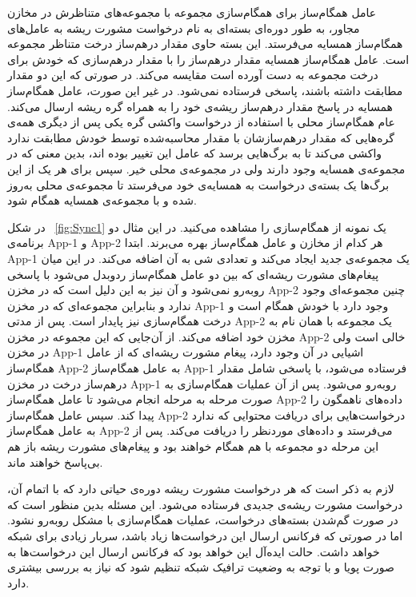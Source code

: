 عامل همگام‌ساز برای همگام‌سازی مجموعه با مجموعه‌های متناظرش در مخازن مجاور، به طور دوره‌ای بسته‌ای به نام درخواست مشورت ریشه به عامل‌های همگام‌ساز همسایه می‌فرستد. این بسته حاوی مقدار درهم‌ساز درخت متناظر مجموعه است. عامل همگام‌ساز همسایه مقدار در‌هم‌ساز را با مقدار در‌هم‌سازی که خودش برای درخت مجموعه به دست آورده است مقایسه می‌کند. در صورتی که این دو مقدار مطابقت داشته باشند، پاسخی فرستاده نمی‌شود. در غیر این صورت، عامل همگام‌ساز همسایه در پاسخ مقدار در‌هم‌ساز ریشه‌ی خود را به همراه گره ریشه ارسال می‌کند. عام همگام‌ساز محلی با استفاده از درخواست واکشی گره یکی پس از دیگری همه‌ی گره‌هایی که مقدار در‌هم‌سازشان با مقدار محاسبه‌شده توسط خودش مطابقت ندارد واکشی می‌کند تا به برگ‌هایی برسد که عامل این تغییر بوده اند، بدین معنی که در مجموعه‌ی همسایه وجود دارند ولی در مجموعه‌ی محلی خیر. سپس برای هر یک از این برگ‌ها یک بسته‌ی درخواست به همسایه‌ی خود می‌فرستد تا مجموعه‌ی محلی به‌روز شده و با مجموعه‌ی همسایه همگام شود.
 	
در شکل ~\ref{fig:Sync1} یک نمونه از همگام‌سازی را مشاهده می‌کنید. در این مثال دو برنامه‌ی App-1 و App-2 هر کدام از مخازن و عامل همگام‌ساز بهره می‌برند. ابتدا App-1 یک مجموعه‌ی جدید ایجاد می‌کند و تعدادی شی به آن اضافه می‌کند. در این میان پیغام‌های مشورت ریشه‌ای که بین دو عامل همگام‌ساز ردوبدل می‌شود با پاسخی روبه‌رو نمی‌شود و آن نیز به این دلیل است که در مخزن App-2 چنین مجموعه‌ای وجود ندارد و بنابراین مجموعه‌ای که در مخزن App-1 وجود دارد با خودش همگام است و درخت همگام‌سازی نیز پایدار است. پس از مدتی App-2 یک مجموعه با همان نام به مخزن خود اضافه می‌کند. از آن‌جایی که این مجموعه در مخزن App-2 خالی است ولی در مخزن App-1 اشیایی در آن وجود دارد، پیغام مشورت ریشه‌ای که از عامل همگام‌ساز App-2 به عامل همگام‌ساز App-1 فرستاده می‌شود، با پاسخی شامل مقدار درهم‌ساز درخت در مخزن App-1 روبه‌رو می‌شود. پس از آن عملیات همگام‌سازی به صورت مرحله به مرحله انجام می‌شود تا عامل همگام‌ساز App-2 داده‌های ناهمگون را پیدا کند. سپس عامل همگام‌ساز App-2 درخواست‌هایی برای دریافت محتوایی که ندارد به عامل همگام‌ساز App-2 می‌فرستد و داده‌های موردنظر را دریافت می‌کند. پس از این مرحله دو مجموعه با هم همگام خواهند بود و پیغام‌های مشورت ریشه باز هم بی‌پاسخ خواهند ماند.

لازم به ذکر است که هر درخواست مشورت ریشه دوره‌ی حیاتی دارد که با اتمام آن، درخواست مشورت ریشه‌ی جدیدی فرستاده می‌شود. این مسئله بدین منظور است که در صورت گم‌شدن  بسته‌های درخواست، عملیات همگام‌سازی با مشکل روبه‌رو نشود. اما در صورتی که فرکانس ارسال این درخواست‌ها زیاد باشد، سربار زیادی برای شبکه خواهد داشت. حالت ایده‌آل این خواهد بود که فرکانس ارسال این درخواست‌ها به صورت پویا و با توجه به وضعیت ترافیک شبکه تنظیم شود که نیاز به بررسی بیشتری دارد.

